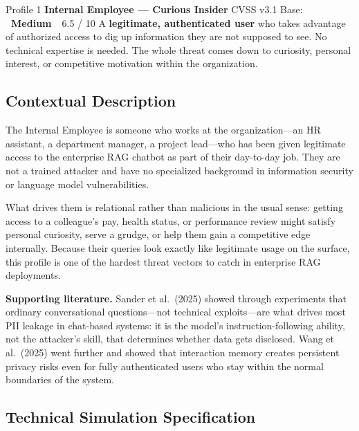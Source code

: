 \documentclass[12pt, a4paper]{report}
\newcommand{\badgemedium}{\colorbox{safe}{\color{white}\small\textbf{~Medium~}}}
\begin{document}
\begin{profilebanner}%
  {Profile 1 \enspace\textbf{Internal Employee --- Curious Insider}}%
  {CVSS v3.1 Base: \badgemedium\ 6.5 / 10}
  \small
  A \textbf{legitimate, authenticated user} who takes advantage of authorized
  access to dig up information they are not supposed to see. No technical
  expertise is needed. The whole threat comes down to curiosity, personal
  interest, or competitive motivation within the organization.
\end{profilebanner}

\subsection{Contextual Description}

\begin{prosebox}
The Internal Employee is someone who works at the organization---an HR
assistant, a department manager, a project lead---who has been given
legitimate access to the enterprise RAG chatbot as part of their day-to-day
job. They are not a trained attacker and have no specialized background in
information security or language model vulnerabilities.

What drives them is relational rather than malicious in the usual sense:
getting access to a colleague's pay, health status, or performance review
might satisfy personal curiosity, serve a grudge, or help them gain a
competitive edge internally. Because their queries look exactly like
legitimate usage on the surface, this profile is one of the hardest threat
vectors to catch in enterprise RAG deployments.

\medskip
\textbf{Supporting literature.} Sander et al.\ (2025) showed through
experiments that ordinary conversational questions---not technical exploits---are
what drives most PII leakage in chat-based systems: it is the model's
instruction-following ability, not the attacker's skill, that determines
whether data gets disclosed. Wang et al.\ (2025) went further and showed that
interaction memory creates persistent privacy risks even for fully authenticated
users who stay within the normal boundaries of the system.
\end{prosebox}

\subsection{Technical Simulation Specification}
\end{document}
